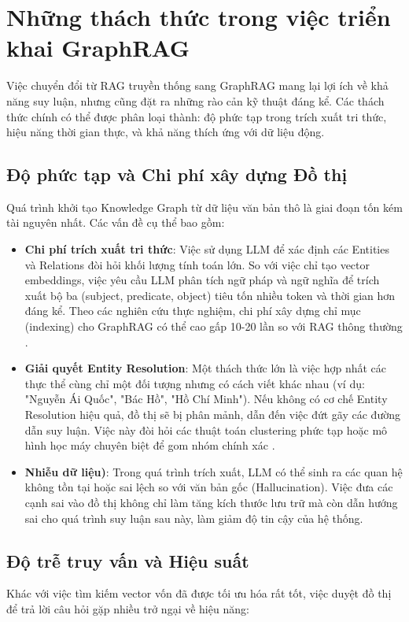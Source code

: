 \section{Những thách thức trong việc triển khai GraphRAG}

Việc chuyển đổi từ RAG truyền thống sang GraphRAG mang lại lợi ích về khả năng suy luận, nhưng cũng đặt ra những rào cản kỹ thuật đáng kể. Các thách thức chính có thể được phân loại thành: độ phức tạp trong trích xuất tri thức, hiệu năng thời gian thực, và khả năng thích ứng với dữ liệu động.

\subsection{Độ phức tạp và Chi phí xây dựng Đồ thị}
Quá trình khởi tạo Knowledge Graph từ dữ liệu văn bản thô là giai đoạn tốn kém tài nguyên nhất. Các vấn đề cụ thể bao gồm:

\begin{itemize}
    \item \textbf{Chi phí trích xuất tri thức}: Việc sử dụng LLM để xác định các Entities và Relations đòi hỏi khối lượng tính toán lớn. So với việc chỉ tạo vector embeddings, việc yêu cầu LLM phân tích ngữ pháp và ngữ nghĩa để trích xuất bộ ba (subject, predicate, object) tiêu tốn nhiều token và thời gian hơn đáng kể. Theo các nghiên cứu thực nghiệm, chi phí xây dựng chỉ mục (indexing) cho GraphRAG có thể cao gấp 10-20 lần so với RAG thông thường \cite{edge2024graphrag}.
    
    \item \textbf{Giải quyết Entity Resolution}: Một thách thức lớn là việc hợp nhất các thực thể cùng chỉ một đối tượng nhưng có cách viết khác nhau (ví dụ: "Nguyễn Ái Quốc", "Bác Hồ", "Hồ Chí Minh"). Nếu không có cơ chế Entity Resolution hiệu quả, đồ thị sẽ bị phân mảnh, dẫn đến việc đứt gãy các đường dẫn suy luận. Việc này đòi hỏi các thuật toán clustering phức tạp hoặc mô hình học máy chuyên biệt để gom nhóm chính xác \cite{pan2024unifying}.
    
    \item \textbf{Nhiễu dữ liệu)}: Trong quá trình trích xuất, LLM có thể sinh ra các quan hệ không tồn tại hoặc sai lệch so với văn bản gốc (Hallucination). Việc đưa các cạnh sai vào đồ thị không chỉ làm tăng kích thước lưu trữ mà còn dẫn hướng sai cho quá trình suy luận sau này, làm giảm độ tin cậy của hệ thống.
\end{itemize}

\subsection{Độ trễ truy vấn và Hiệu suất}
Khác với việc tìm kiếm vector vốn đã được tối ưu hóa rất tốt, việc duyệt đồ thị để trả lời câu hỏi gặp nhiều trở ngại về hiệu năng:

